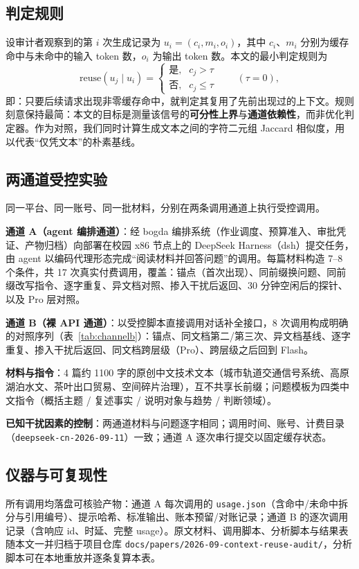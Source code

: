 \documentclass[11pt, a4paper]{ctexart}
\begin{document}
\subsection{判定规则}
设审计者观察到的第 $i$ 次生成记录为
$u_i = (c_i, m_i, o_i)$，其中 $c_i$、$m_i$ 分别为缓存命中与未命中的输入 token 数，$o_i$ 为输出 token 数。本文的最小判定规则为
\begin{equation}
\mathrm{reuse}(u_j \mid u_i) =
\begin{cases}
\text{是}, & c_j > \tau \\
\text{否}, & c_j \le \tau
\end{cases}
\qquad (\tau = 0),
\label{eq:rule}
\end{equation}
即：只要后续请求出现非零缓存命中，就判定其复用了先前出现过的上下文。规则刻意保持最简：本文的目标是测量该信号的\textbf{可分性上界}与\textbf{通道依赖性}，而非优化判定器。作为对照，我们同时计算生成文本之间的字符二元组 Jaccard 相似度，用以代表“仅凭文本”的朴素基线。

\subsection{两通道受控实验}
同一平台、同一账号、同一批材料，分别在两条调用通道上执行受控调用。

\textbf{通道 A（agent 编排通道）}：经 bogda 编排系统（作业调度、预算准入、审批凭证、产物归档）向部署在校园 x86 节点上的 DeepSeek Harness（dsh）提交任务，由 agent 以编码代理形态完成“阅读材料并回答问题”的调用。每篇材料构造 7--8 个条件，共 17 次真实付费调用，覆盖：锚点（首次出现）、同前缀换问题、同前缀改写指令、逐字重复、异文档对照、掺入干扰后返回、30 分钟空闲后的探针、以及 Pro 层对照。

\textbf{通道 B（裸 API 通道）}：以受控脚本直接调用对话补全接口，8 次调用构成明确的对照序列（表~\ref{tab:channelb}）：锚点、同文档第二/第三次、异文档基线、逐字重复、掺入干扰后返回、同文档跨层级（Pro）、跨层级之后回到 Flash。

\textbf{材料与指令}：4 篇约 1100 字的原创中文技术文本（城市轨道交通信号系统、高原湖泊水文、茶叶出口贸易、空间碎片治理），互不共享长前缀；问题模板为四类中文指令（概括主题 / 复述事实 / 说明对象与趋势 / 判断领域）。

\textbf{已知干扰因素的控制}：两通道材料与问题逐字相同；调用时间、账号、计费目录（\texttt{deepseek-cn-2026-09-11}）一致；通道 A 逐次串行提交以固定缓存状态。

\subsection{仪器与可复现性}
所有调用均落盘可核验产物：通道 A 每次调用的 \texttt{usage.json}（含命中/未命中拆分与引用编号）、提示哈希、标准输出、账本预留/对账记录；通道 B 的逐次调用记录（含响应 id、时延、完整 usage）。原文材料、调用脚本、分析脚本与结果表随本文一并归档于项目仓库
\texttt{docs/papers/2026-09-context-reuse-audit/}，分析脚本可在本地重放并逐条复算本表。
\end{document}
